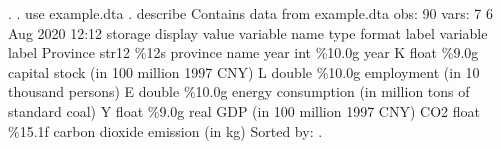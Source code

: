 . 
. use example.dta
{\smallskip}
. describe 
{\smallskip}
Contains data from example.dta
  obs:            90                          
 vars:             7                          6 Aug 2020 12:12
              storage   display    value
variable name   type    format     label      variable label
Province        str12   \%12s                  province name
year            int     \%10.0g                year
K               float   \%9.0g                 capital stock (in 100 million 1997 CNY)
L               double  \%10.0g                employment (in 10 thousand persons)
E               double  \%10.0g                energy consumption (in million tons of standard coal)
Y               float   \%9.0g                 real GDP (in 100 million 1997 CNY)
CO2             float   \%15.1f                carbon dioxide emission (in kg)
Sorted by: 
{\smallskip}
. 
